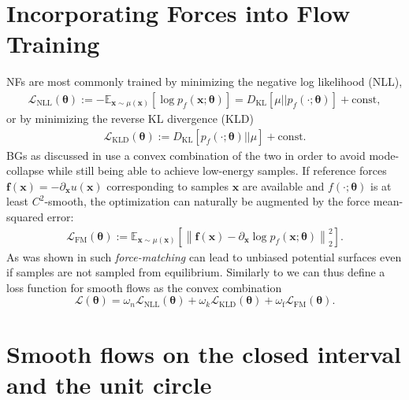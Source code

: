 \documentclass{article}
\newcommand{\TODO}[1]{{\color{orange} \textbf{TODO:} #1 }}
\begin{document}
\section{Incorporating Forces into Flow Training}
NFs are most commonly trained by minimizing the negative log likelihood (NLL), 
\begin{align}
    \mathcal{L}_{\mathrm{NLL}}(\bm \theta) := -\mathbb{E}_{\bm x \sim \mu(\bm x)} [\log p_{f}(\bm x; \bm\theta)] = 
    D_\mathrm{KL}[\mu||p_{f}(\cdot; \bm\theta)]+ \mathrm{const},
\end{align}
or by minimizing the reverse KL divergence (KLD)
\begin{align}
    \mathcal{L}_{\mathrm{KLD}}(\bm \theta) :=
    D_\mathrm{KL}[p_{f}(\cdot; \bm\theta)||\mu] + \mathrm{const}.
\end{align}
BGs as discussed in \citet{noe2019boltzmann} use a convex combination of the two in order to avoid mode-collapse while still being able to achieve low-energy samples.
If reference forces $\mathbf{f}(\bm x) = - \partial_{\bm x} u(\bm x)$ corresponding to samples $\bm{x}$ are available and $f(\cdot; \bm \theta)$ is at least $C^{2}$-smooth, the optimization can naturally be augmented by the force mean-squared error:
\begin{align}
    \mathcal{L}_{\mathrm{FM}}(\bm \theta) := \mathbb{E}_{\bm x \sim \mu(\bm x)} \left[\left\| \mathbf{f}(\bm x) - \partial_{\bm{x}} \log p_{f}(\bm x; \bm \theta) \right\|_{2}^{2}\right].
\end{align}
As was shown in \citet{wang2019machine} such \textit{force-matching} can lead to unbiased potential surfaces even if samples are not sampled from equilibrium. Similarly to \citet{noe2019boltzmann} we can thus define a loss function for smooth flows as the convex combination
\begin{equation}
    \mathcal{L}(\bm \theta) = \omega_n \mathcal{L}_{\mathrm{NLL}}(\bm \theta)
        + \omega_k \mathcal{L}_{\mathrm{KLD}}(\bm \theta)
        + \omega_{\mathrm{f}}  \mathcal{L}_{\mathrm{FM}}(\bm \theta).
\label{eq:loss}
\end{equation}



\section{Smooth flows on the closed interval and the unit circle}
\label{sec:bump-functions}
\end{document}
